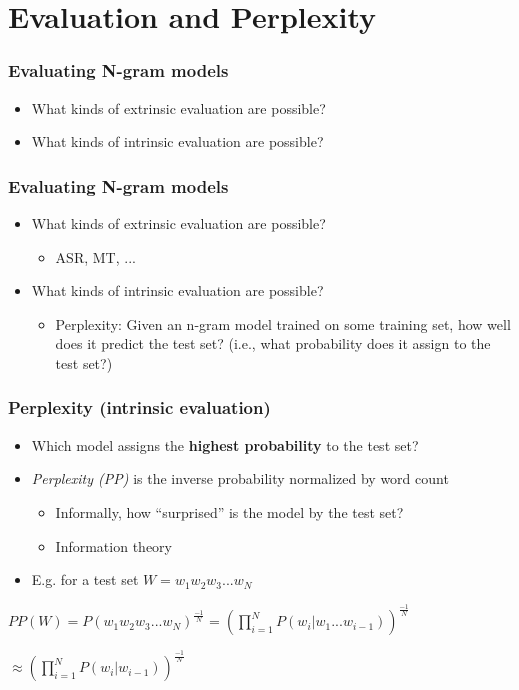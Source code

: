 \documentclass{beamer}
\begin{document}
\section{Evaluation and Perplexity}
\begin{frame}
\frametitle{Evaluating N-gram models}
\begin{itemize}
\item What kinds of extrinsic evaluation are possible?
\item What kinds of intrinsic evaluation are possible?
\end{itemize}
\end{frame}

\begin{frame}
\frametitle{Evaluating N-gram models}
\begin{itemize}
\item What kinds of extrinsic evaluation are possible?
\begin{itemize}
\item ASR, MT, ...
\end{itemize}
\item What kinds of intrinsic evaluation are possible?
\begin{itemize}
\item Perplexity: Given an n-gram model trained on some training set, how well does it predict the test set? (i.e., what probability does it assign to the test set?)
\end{itemize}
\end{itemize}
\end{frame}


\begin{frame}
\frametitle{Perplexity (intrinsic evaluation)}
\begin{itemize}
\item Which model assigns the {\bf highest probability} to the test set?
\item {\it Perplexity (PP)} is the inverse probability normalized by word count 
\begin{itemize}
\item Informally, how ``surprised'' is the model by the test set?
\item Information theory
\end{itemize}
\item E.g. for a test set $W = w_1w_2w_3...w_N$
\end{itemize}

$PP(W) = P(w_1w_2w_3...w_N)^{\frac{-1}{N}} = (\prod_{i=1}^N{P(w_i\vert w_1...w_{i-1})})^{\frac{-1}{N}}$

\vspace{0.5cm}

$\approx (\prod_{i=1}^N{P(w_i\vert w_{i-1})})^{\frac{-1}{N}}$

\end{frame}
\end{document}
